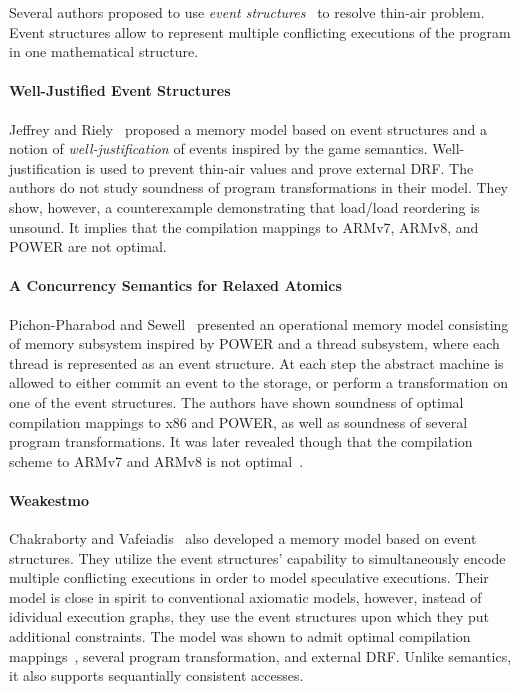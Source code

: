 Several authors proposed to use \emph{event structures}~\cite{Winskel:86}
to resolve thin-air problem. Event structures allow to represent 
multiple conflicting executions of the program in one mathematical structure.  

\paragraph{Well-Justified Event Structures}

Jeffrey and Riely~\cite{Jeffrey-Riely:LICS16} proposed 
a memory model based on event structures and a notion of 
\emph{well-justification} of events inspired by the game semantics. 
Well-justification is used to prevent thin-air values 
and prove external DRF. The authors do not study 
soundness of program transformations in their model. 
They show, however, a counterexample demonstrating that 
load/load reordering is unsound. It implies that 
the compilation mappings to ARMv7, ARMv8, and POWER are not optimal.   

\paragraph{A Concurrency Semantics for Relaxed Atomics}

Pichon-Pharabod and Sewell~\cite{PichonPharabod-Sewell:POPL16} 
presented an operational memory model consisting of 
memory subsystem inspired by POWER and a thread subsystem, 
where each thread is represented as an event structure. 
At each step the abstract machine is allowed to either 
commit an event to the storage, or perform a transformation 
on one of the event structures. 
The authors have shown soundness of 
optimal compilation mappings to x86 and POWER, 
as well as soundness of several program transformations.
It was later revealed though that the compilation scheme
to ARMv7 and ARMv8 is not optimal~\cite{PichonPharabod:PhD18}.

\paragraph{Weakestmo}

Chakraborty and Vafeiadis~\cite{Chakraborty-Vafeiadis:POPL19}
also developed a memory model based on event structures. 
They utilize the event structures' capability to simultaneously encode 
multiple conflicting executions in order to model speculative executions.
Their model is close in spirit to conventional axiomatic models, 
however, instead of idividual execution graphs, they use 
the event structures upon which they put additional constraints. 
The model was shown to admit optimal compilation mappings~\cite{Moiseenko-al:ECOOP20},
several program transformation, and external DRF.
Unlike \Promising semantics, it also supports 
sequantially consistent accesses.

